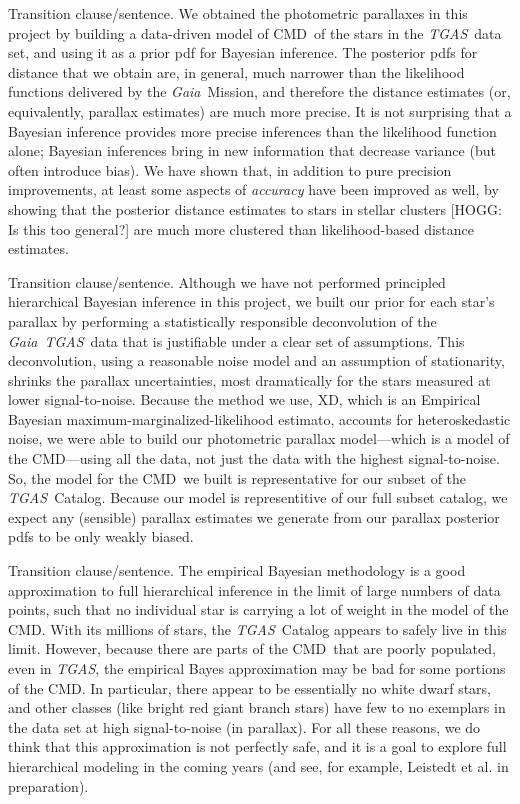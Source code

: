\documentclass[modern]{aastex61}
\newcommand{\acronym}[1]{{\small{#1}}}
\newcommand{\project}[1]{\textsl{#1}}
\newcommand{\tgas}{\project{\acronym{TGAS}}}
\newcommand{\gaia}{\project{Gaia}}
\newcommand{\xd}{\acronym{XD}}
\newcommand{\cmd}{\acronym{CMD}}
\begin{document}
Transition clause/sentence. We obtained the photometric parallaxes in this project
by building a data-driven model of \cmd\ of the stars in the \tgas\ data set,
and using it as a prior pdf for Bayesian inference.
The posterior pdfs for distance that we obtain are, in general, much
narrower than the likelihood functions delivered by the
\gaia\ Mission, and therefore the distance estimates (or,
equivalently, parallax estimates) are much more precise.
It is not surprising that a Bayesian inference provides more
precise inferences than the likelihood function alone; Bayesian
inferences bring in new information that decrease variance (but
often introduce bias).
We have shown that, in addition to pure precision improvements, at
least some aspects of \emph{accuracy} have been improved as well, by
showing that the posterior distance estimates to stars in stellar
clusters [HOGG: Is this too general?] are much more clustered than likelihood-based distance
estimates.

Transition clause/sentence. Although we have not performed principled hierarchical Bayesian inference in this
project, we built our prior for each star's parallax by
performing a statistically responsible deconvolution
of the \gaia\ \tgas\ data that is justifiable under a clear set of
assumptions.
This deconvolution, using a reasonable noise model and an
assumption of stationarity, shrinks the parallax uncertainties, most dramatically for the stars measured at lower signal-to-noise.
Because the method we use, \xd, which is
an Empirical Bayesian maximum-marginalized-likelihood estimato, accounts for
heteroskedastic noise, we were able to build our photometric parallax
model---which is a model of the \cmd---using
all the data, not just the data with the highest signal-to-noise.
So, the model for the \cmd\ we built is representative for
our subset of the \tgas\ Catalog.
Because our model is representitive of our full subset catalog, we expect any (sensible) parallax estimates
we generate from our parallax posterior pdfs to be only weakly biased.

Transition clause/sentence. The empirical Bayesian methodology is a good approximation to full
hierarchical inference in the limit of large numbers of data points, such that no individual star is carrying a lot of weight in the
model of the \cmd.
With its millions of stars, the \tgas\ Catalog appears to safely
live in this limit.
However, because there are parts of the \cmd\ that are poorly populated,
even in \tgas, the empirical Bayes approximation may be bad for some
portions of the \cmd.
In particular, there appear to be essentially no white dwarf stars,
and other classes (like bright red giant branch stars) have few to no exemplars
in the data set at high signal-to-noise (in parallax).
For all these reasons, we do think that this approximation is not perfectly
safe, and it is a goal to explore full hierarchical modeling in the coming
years (and see, for example, Leistedt et al. in preparation).
\end{document}
